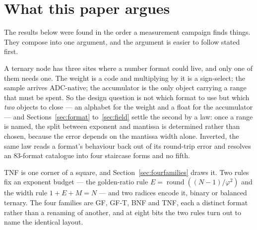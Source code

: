 \documentclass[11pt]{article}
\theoremstyle{definition}
\begin{document}
\begin{abstract}
\textbf{At matched physical width the comparison is negative.} Computed from
the committed reference implementations, posit holds more representable values
than TNF and a finer step at unity at every width the ladder occupies --- $12\times$
finer at 19 bits, $4\times$ at 10, $2\times$ at 6 --- and posit with $es{=}2$ weakly
dominates on both coordinates at all three. A ternary exponent does not tile a
binary field: four trits use $81$ of $128$ codes, leaving $8{,}190$ of the $2^{19}$
words unreachable. The no-survivors corollary is accordingly withdrawn to a
matched-\emph{name} claim (Section~\ref{sec:matchedwidth}). The case for this
format was never precision per bit; it is multiplier removal, decode cost and the
rungs where nothing else trains.

Twenty-two retractions of our own claims were made during the work, and are
enumerated in Section~\ref{sec:selfcheck}. Eighteen retractions are marked in
place below; the remaining two were themselves withdrawn.
\end{abstract}

\section{What this paper argues}
\label{sec:roadmap}

The results below were found in the order a measurement campaign finds things.
They compose into one argument, and the argument is easier to follow stated
first.

A ternary node has three sites where a number format could live, and only one of
them needs one. The weight is a code and multiplying by it is a sign-select; the
sample arrives ADC-native; the accumulator is the only object carrying a range
that must be spent. So the design question is not which format to use but which
\emph{two} objects to close --- an alphabet for the weight and a float for the
accumulator --- and Sections~\ref{sec:format} to~\ref{sec:field} settle the
second by a law: once a range is named, the split between exponent and mantissa
is determined rather than chosen, because the error depends on the mantissa
width alone. Inverted, the same law reads a format's behaviour back out of its
round-trip error and resolves an 83-format catalogue into four staircase forms
and no fifth.

TNF is one corner of a square, and Section~\ref{sec:fourfamilies} draws it. Two
rules fix an exponent budget --- the golden-ratio rule
$E=\operatorname{round}((N-1)/\varphi^{2})$ and the width rule $1+E+M=N$ --- and
two radices encode it, binary or balanced ternary. The four families are GF,
GF-T, BNF and TNF, each a distinct format rather than a renaming of another, and
at eight bits the two rules turn out to name the identical layout.
\end{document}
